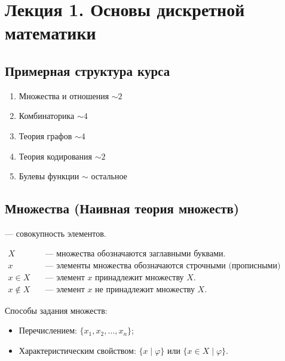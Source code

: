 \section{Лекция 1. Основы дискретной математики}

\subsection*{Примерная структура курса}

\begin{enumerate}
    \item Множества и отношения \hfill \(\sim 2\)
    \item Комбинаторика \hfill \(\sim 4\)
    \item Теория графов \hfill \(\sim 4\)
    \item Теория кодирования \hfill \(\sim 2\)
    \item Булевы функции \hfill \(\sim\) остальное
\end{enumerate}

\subsection{Множества (Наивная теория множеств)}

\begin{definition}
     --- совокупность элементов.
\end{definition}

\begin{designation}
    \begin{align*}
        X \quad &\text{--- множества обозначаются заглавными буквами.} \\
        x \quad &\text{--- элементы множества обозначаются строчными (прописными) буквами.} \\
        x \in X \quad &\text{--- элемент } x \text{ принадлежит множеству } X. \\
        x \notin X \quad &\text{--- элемент } x \text{ не принадлежит множеству } X.
    \end{align*}
\end{designation}

\noindent Способы задания множеств:
\begin{itemize}
    \item Перечислением: \(\{x_1, x_2, \dots, x_n\}\);
    \item Характеристическим свойством: \(\{x \mid \varphi\}\) или \(\{x \in X \mid \varphi\}\).
\end{itemize}

